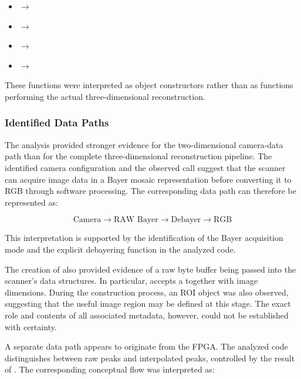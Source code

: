 \begin{itemize}
    \item {} $\rightarrow$ 
    \item {} $\rightarrow$ 
    \item {} $\rightarrow$ 
    \item {} $\rightarrow$ 
\end{itemize}

These functions were interpreted as object constructors rather than as functions performing the actual three-dimensional reconstruction.

\subsubsection{Identified Data Paths}

The analysis provided stronger evidence for the two-dimensional camera-data path than for the complete three-dimensional reconstruction pipeline. The identified camera configuration and the observed  call suggest that the scanner can acquire image data in a Bayer mosaic representation before converting it to RGB through software processing. The corresponding data path can therefore be represented as:

\[
\text{Camera}
\rightarrow
\text{RAW Bayer}
\rightarrow
\text{Debayer}
\rightarrow
\text{RGB}
\]

This interpretation is supported by the identification of the Bayer acquisition mode and the explicit debayering function in the analyzed code. 

The creation of  also provided evidence of a raw byte buffer being passed into the scanner's data structures. In particular,  accepts a  together with image dimensions. During the construction process, an ROI object was also observed, suggesting that the useful image region may be defined at this stage. The exact role and contents of all associated metadata, however, could not be established with certainty.

A separate data path appears to originate from the FPGA. The analyzed code distinguishes between raw peaks and interpolated peaks, controlled by the result of . The corresponding conceptual flow was interpreted as:

